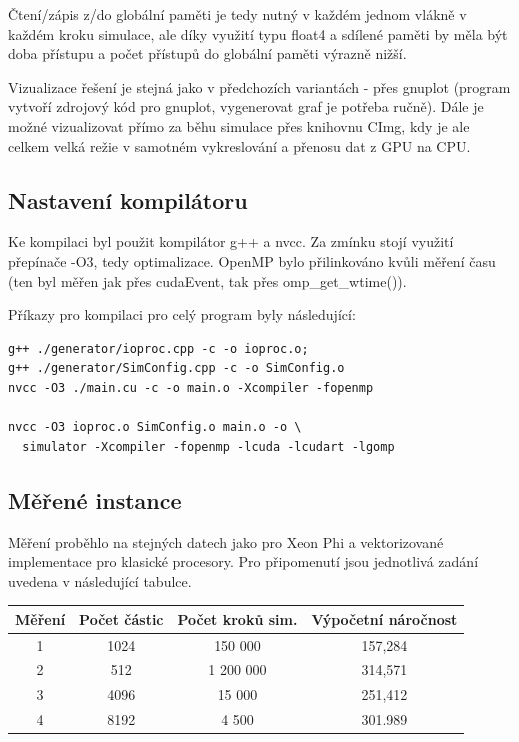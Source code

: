 \documentclass[12pt]{article}
\begin{document}
Čtení/zápis z/do globální paměti je tedy nutný v každém jednom vlákně v každém kroku simulace,
ale díky využití typu float4 a sdílené paměti by měla být doba přístupu a počet přístupů do globální paměti výrazně nižší.

Vizualizace řešení je stejná jako v předchozích variantách
- přes gnuplot (program vytvoří zdrojový kód pro gnuplot, vygenerovat graf je potřeba ručně).
Dále je možné vizualizovat přímo za běhu simulace přes knihovnu CImg, kdy je ale celkem velká režie v samotném vykreslování a přenosu dat z GPU na CPU.

\subsection{Nastavení kompilátoru}
Ke kompilaci byl použit kompilátor g++ a nvcc. Za zmínku stojí využití přepínače -O3, tedy optimalizace.
OpenMP bylo přilinkováno kvůli měření času (ten byl měřen jak přes cudaEvent, tak přes omp\_get\_wtime()).

Příkazy pro kompilaci pro celý program byly následující:
\begin{verbatim}
g++ ./generator/ioproc.cpp -c -o ioproc.o;
g++ ./generator/SimConfig.cpp -c -o SimConfig.o
nvcc -O3 ./main.cu -c -o main.o -Xcompiler -fopenmp

nvcc -O3 ioproc.o SimConfig.o main.o -o \
  simulator -Xcompiler -fopenmp -lcuda -lcudart -lgomp
\end{verbatim}

\subsection{Měřené instance}
Měření proběhlo na stejných datech jako pro Xeon Phi a vektorizované implementace pro klasické procesory.
Pro připomenutí jsou jednotlivá zadání uvedena v následující tabulce.

\begin{center}
\begin{tabular}{c | c | c | c}
\textbf{Měření} & \textbf{Počet částic} & \textbf{Počet kroků sim.} & \textbf{Výpočetní náročnost} \\ \hline \hline
1 & 1024 & 150 000 & 157,284 \\ \hline
2 & 512 & 1 200 000 & 314,571 \\ \hline
3 & 4096 & 15 000 & 251,412 \\ \hline
4 & 8192 & 4 500 & 301.989 \\ \hline
\end{tabular}
\end{center}
\end{document}
